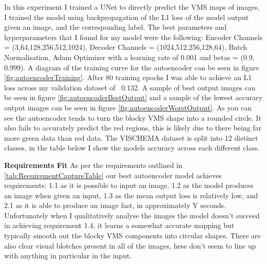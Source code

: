 \documentclass{UoYCSproject}
\begin{document}
In this experiment I trained a UNet to directly predict the VMS maps of images, I trained the model using backpropagation of the L1 loss of the model output given an image, and the corresponding label. The best parameters and hyperparameters that I found for my model were the following: Encoder Channels = (3,64,128,256,512,1024), Decoder Channels = (1024,512,256,128,64), Batch Normalisation, Adam Optimizer with a learning rate of 0.001 and betas = (0.9, 0.999). A diagram of the training curve for the autoencoder can be seen in figure \ref{fig:autoencoderTraining}. After 80 training epochs I was able to achieve an L1 loss across my validation dataset of ~0.132. A sample of best output images can be seen in figure \ref{fig:autoencoderBestOutput} and a sample of the lowest accurary output images can be seen in figure \ref{fig:autoencoderWorstOutput}. As you can see the autoencoder tends to turn the blocky VMS shape into a rounded circle. It also fails to accurately predict the red regions, this is likely due to there being far more green data than red data. The VISCHEMA dataset is split into 12 distinct classes, in the table below I show the models accuracy across each different class.

\textbf{Requirements Fit}
As per the requirements outlined in \ref{tab:RequirementCaptureTable} our best autoencoder model achieves requirements: 1.1 as it is possible to input an image, 1.2 as the model produces an image when given an input, 1.3 as the mean output loss is relatively low, and 2.1 as it is able to produce an image fast, in approximately Y seconds.
Unfortunately when I qualitatively analyse the images the model doesn't succeed in achieving requirement 1.4, it learns a somewhat accurate mapping but typically smooth out the blocky VMS components into circular shapes. There are also clear visual blotches present in all of the images, hese don't seem to line up with anything in particular in the input.   
\end{document}

